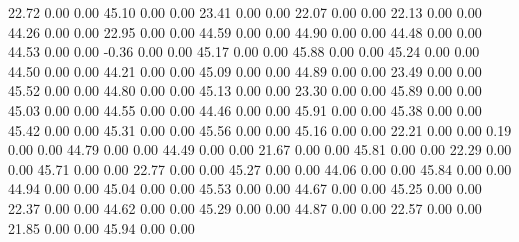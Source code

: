    22.72   0.00   0.00
   45.10   0.00   0.00
   23.41   0.00   0.00
   22.07   0.00   0.00
   22.13   0.00   0.00
   44.26   0.00   0.00
   22.95   0.00   0.00
   44.59   0.00   0.00
   44.90   0.00   0.00
   44.48   0.00   0.00
   44.53   0.00   0.00
   -0.36   0.00   0.00
   45.17   0.00   0.00
   45.88   0.00   0.00
   45.24   0.00   0.00
   44.50   0.00   0.00
   44.21   0.00   0.00
   45.09   0.00   0.00
   44.89   0.00   0.00
   23.49   0.00   0.00
   45.52   0.00   0.00
   44.80   0.00   0.00
   45.13   0.00   0.00
   23.30   0.00   0.00
   45.89   0.00   0.00
   45.03   0.00   0.00
   44.55   0.00   0.00
   44.46   0.00   0.00
   45.91   0.00   0.00
   45.38   0.00   0.00
   45.42   0.00   0.00
   45.31   0.00   0.00
   45.56   0.00   0.00
   45.16   0.00   0.00
   22.21   0.00   0.00
    0.19   0.00   0.00
   44.79   0.00   0.00
   44.49   0.00   0.00
   21.67   0.00   0.00
   45.81   0.00   0.00
   22.29   0.00   0.00
   45.71   0.00   0.00
   22.77   0.00   0.00
   45.27   0.00   0.00
   44.06   0.00   0.00
   45.84   0.00   0.00
   44.94   0.00   0.00
   45.04   0.00   0.00
   45.53   0.00   0.00
   44.67   0.00   0.00
   45.25   0.00   0.00
   22.37   0.00   0.00
   44.62   0.00   0.00
   45.29   0.00   0.00
   44.87   0.00   0.00
   22.57   0.00   0.00
   21.85   0.00   0.00
   45.94   0.00   0.00
